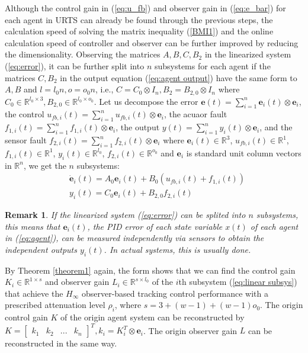 \documentclass{ieeeaccess}
\newtheorem{remark}{Remark}
\begin{document}
Although the control gain in (\ref{eq:u_fb}) and observer gain in (\ref{eq:e_bar}) for each agent in URTS can already be found through the previous steps, the calculation speed of solving the matrix inequality (\ref{BMI1}) and the online calculation speed of controller and observer can be further improved by reducing the dimensionality. Observing the matrices $A,B,C,B_2$ in the linearized system (\ref{eq:error}), it can be further split into $n$ subsystems for each agent if the matrices $C,B_2$ in the output equation (\ref{eq:agent output}) have the same form to $A,B$ and $l=l_0n, o=o_0n$, i.e., $C = C_0\otimes I_n,B_2 = B_{2,0}\otimes I_n$ where $C_0\in\mathbb{R}^{l_0\times 3},B_{2,0}\in\mathbb{R}^{l_0\times o_0}$. Let us decompose the error $\pmb{e}(t)=\sum_{i=1}^{n} \pmb{e}_i(t)\otimes\mathbf{e}_i$, the control $u_{fb,i}(t)=\sum_{i=1}^{n} {u}_{fb,i}(t)\otimes\mathbf{e}_i$, the acuaor fault $f_{1,i}(t)=\sum_{i=1}^{n} {f}_{1,i}(t)\otimes\mathbf{e}_i$, the output $y(t)=\sum_{i=1}^{n} {y}_i(t)\otimes\mathbf{e}_i$, and the sensor fault $f_{2,i}(t)=\sum_{i=1}^{n} {f}_{2,i}(t)\otimes\mathbf{e}_i$ where $\pmb{e}_i(t)\in\mathbb{R}^3$, $u_{fb,i}(t)\in\mathbb{R}^1$, $f_{1,i}(t)\in\mathbb{R}^1$, $y_i(t)\in\mathbb{R}^{l_0}$, $f_{2,i}(t)\in\mathbb{R}^{o_0}$ and $\mathbf{e}_i$ is standard unit column vectors in $\mathbb{R}^n$, we get the $n$ subsystems:
\begin{equation} \label{eq:linear subsys}
    \begin{split}
        & \dot{\pmb{e}}_i(t)=A_0\pmb{e}_i(t)+B_0(u_{fb,i}(t)+f_{1,i}(t)) \\
        & {y}_i(t)=C_0\pmb{e}_i(t)+B_{2,0}f_{2,i}(t)   
    \end{split}
\end{equation}
\begin{remark}
    If the linearized system (\ref{eq:error}) can be splited into $n$ subsystems, this means that $\pmb{e}_i(t)$, the PID error of each state variable $x(t)$ of each agent in (\ref{eq:agent}), can be measured independently via sensors to obtain the independent outputs $y_i(t)$. In actual systems, this is usually done.
\end{remark}

By Theorem \ref{theorem1} again, the form shows that we can find the control gain $K_i\in\mathbb{R}^{1\times s}$ and observer gain $L_i\in\mathbb{R}^{s\times l_0}$ of the $i$th subsystem (\ref{eq:linear subsys}) that achieve the $H_\infty$ observer-based tracking control performance with a prescribed attenuation level $\rho_i$, where $s=3+(w-1)+(w-1)o_0$. The origin control gain $K$ of the origin agent system can be reconstructed by $K = \begin{bmatrix}
    \mathit{k}_1 & \mathit{k}_2 & ... & \mathit{k}_n
\end{bmatrix}^T, \mathit{k}_i=K_i^T\otimes\mathbf{e}_i$. The origin observer gain $L$ can be reconstructed in the same way. 
\end{document}
